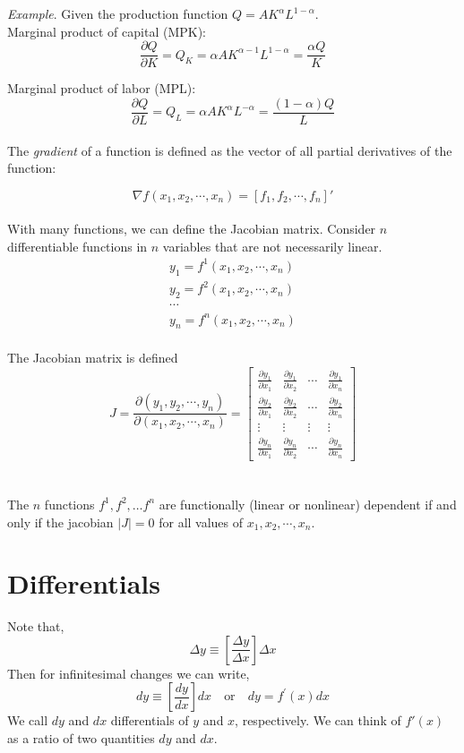 \documentclass{./../Latex/handout}
\begin{document}
\textit{Example}. Given the production function $ Q = A K^{\alpha} L^{1-\alpha} $. \\
Marginal product of capital (MPK):
	$$\frac{\partial Q}{ \partial K} = Q_K =  \alpha A K^{\alpha-1}L^{1-\alpha}  =  \frac{\alpha Q}{K} $$

Marginal product of labor (MPL):
	$$\frac{\partial Q}{ \partial L} = Q_L = \alpha A K^{\alpha}L^{-\alpha}  =  \frac{(1-\alpha) Q}{L}$$ \\

The \textit{gradient} of a function is defined as the vector of all partial derivatives of the function:

$$ \nabla f(x_1, x_2, \cdots, x_n) = [f_1, f_2, \cdots, f_n]' $$ \\


With many functions, we can define the Jacobian matrix. Consider $n$ differentiable functions in $n$ variables that are not necessarily linear.
$$
\begin{gathered}
y_{1}=f^{1}\left(x_{1}, x_{2}, \cdots, x_{n}\right) \\
y_{2}=f^{2}\left(x_{1}, x_{2}, \cdots, x_{n}\right) \\
\cdots \\
y_{n}=f^{n}\left(x_{1}, x_{2}, \cdots, x_{n}\right)
\end{gathered}
$$ \\
The Jacobian matrix is defined
$$
J=\frac{\partial\left(y_{1}, y_{2}, \cdots, y_{n}\right)}{\partial\left(x_{1}, x_{2}, \cdots, x_{n}\right)}=\left[\begin{array}{llll}
\frac{\partial y_{1}}{\partial x_{1}} & \frac{\partial y_{1}}{\partial x_{2}} & \cdots & \frac{\partial y_{1}}{\partial x_{n}} \\
\frac{\partial y_{2}}{\partial x_{1}} & \frac{\partial y_{2}}{\partial x_{2}} & \cdots & \frac{\partial y_{2}}{\partial x_{n}} \\
\vdots & \vdots & \vdots & \vdots \\
\frac{\partial y_{n}}{\partial x_{1}} & \frac{\partial y_{n}}{\partial x_{2}} & \cdots & \frac{\partial y_{n}}{\partial x_{n}}
\end{array}\right] 
$$ \\~\\
The $n$ functions $f^{1}, f^{2}, \ldots f^{n}$ are functionally (linear or nonlinear) dependent if and only if the jacobian $|J|=0$ for all values of $x_{1}, x_{2}, \cdots, x_{n}$.

\section*{Differentials}
Note that, 
$$
\Delta y \equiv\left[\frac{\Delta y}{\Delta x}\right] \Delta x
$$ 
Then for infinitesimal changes we can write,
$$
d y \equiv\left[\frac{d y}{d x}\right] d x \quad \text {or} \quad d y=f^{\prime}(x) d x
$$ 
We call $d y$ and $dx$ differentials of $y$ and $x$, respectively. We can think of $f'(x)$ as a ratio of two quantities $ dy $ and $dx$. \\
\end{document}
